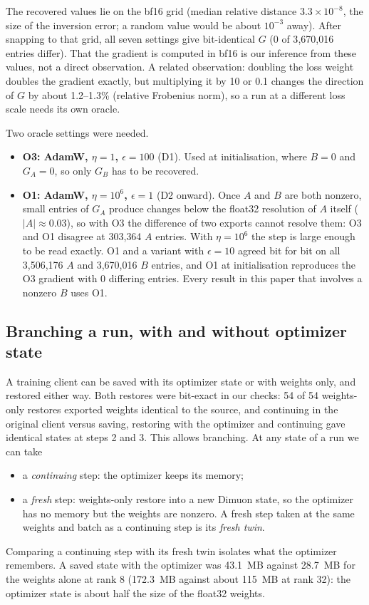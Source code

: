 \documentclass[11pt]{article}
\begin{document}
The recovered values lie on the bf16 grid (median relative distance $3.3\times10^{-8}$, the size of
the inversion error; a random value would be about $10^{-3}$ away). After snapping to that grid, all
seven settings give bit-identical $G$ (0 of 3{,}670{,}016 entries differ). That the gradient is
computed in bf16 is our inference from these values, not a direct observation. A related
observation: doubling the loss weight doubles the gradient exactly, but multiplying it by 10 or 0.1
changes the direction of $G$ by about 1.2--1.3\% (relative Frobenius norm), so a run at a different
loss scale needs its own oracle.

Two oracle settings were needed.
\begin{itemize}
\item \textbf{O3: AdamW, $\eta=1$, $\epsilon=100$} (D1). Used at initialisation, where $B=0$ and
$G_A=0$, so only $G_B$ has to be recovered.
\item \textbf{O1: AdamW, $\eta=10^6$, $\epsilon=1$} (D2 onward). Once $A$ and $B$ are both nonzero,
small entries of $G_A$ produce changes below the float32 resolution of $A$ itself ($|A|\approx0.03$),
so with O3 the difference of two exports cannot resolve them: O3 and O1 disagree at 303{,}364
$A$ entries. With $\eta=10^6$ the step is large enough to be read exactly. O1 and a variant with
$\epsilon=10$ agreed bit for bit on all 3{,}506{,}176 $A$ and 3{,}670{,}016 $B$ entries, and O1 at
initialisation reproduces the O3 gradient with 0 differing entries. Every result in this paper that
involves a nonzero $B$ uses O1.
\end{itemize}

\subsection{Branching a run, with and without optimizer state}
A training client can be saved with its optimizer state or with weights only, and restored either
way. Both restores were bit-exact in our checks: 54 of 54 weights-only restores exported weights
identical to the source, and continuing in the original client versus saving, restoring with the
optimizer and continuing gave identical states at steps 2 and 3. This allows branching. At any state
of a run we can take
\begin{itemize}
\item a \emph{continuing} step: the optimizer keeps its memory;
\item a \emph{fresh} step: weights-only restore into a new Dimuon state, so the optimizer has no
memory but the weights are nonzero. A fresh step taken at the same weights and batch as a
continuing step is its \emph{fresh twin}.
\end{itemize}
Comparing a continuing step with its fresh twin isolates what the optimizer remembers. A saved state
with the optimizer was 43.1~MB against 28.7~MB for the weights alone at rank 8 (172.3~MB against
about 115~MB at rank 32): the optimizer state is about half the size of the float32 weights.
\end{document}
